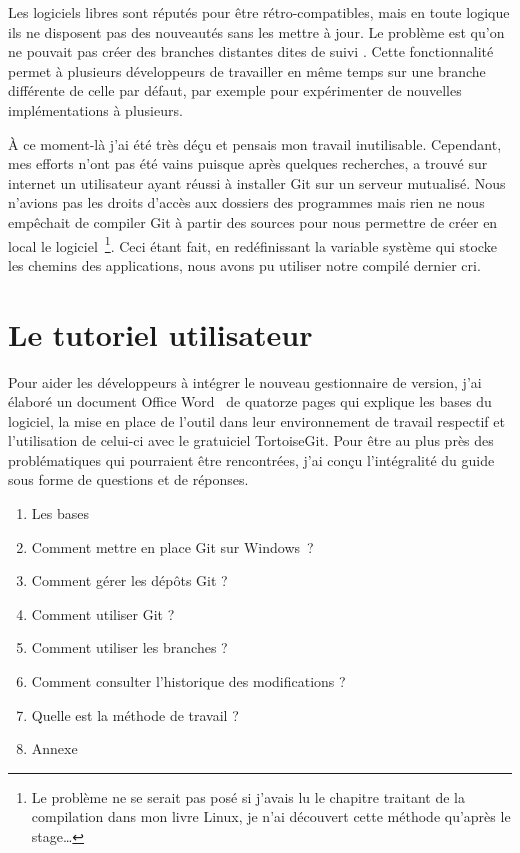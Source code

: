 Les logiciels libres sont réputés pour être rétro-compatibles, mais en
toute logique ils ne disposent pas des nouveautés sans les mettre à jour.
Le problème est qu'on ne pouvait pas créer des branches distantes dites
\og de suivi \fg{}. Cette fonctionnalité permet à plusieurs développeurs
de travailler en même temps sur une branche différente de celle par
défaut, par exemple pour expérimenter de nouvelles implémentations à
plusieurs.

À ce moment-là j'ai été très déçu et pensais mon travail inutilisable.
Cependant, mes efforts n'ont pas été vains puisque  après
quelques recherches, a trouvé sur internet un utilisateur ayant réussi à
installer Git sur un serveur mutualisé.  Nous n'avions pas les droits
d'accès aux dossiers des programmes mais rien ne nous empêchait de
compiler Git à partir des sources pour nous permettre de créer en local
le logiciel\, \footnote{Le problème ne se serait pas posé si j'avais lu
le chapitre traitant de la compilation dans mon livre Linux, je n'ai
découvert cette méthode qu'après le stage\dots}. Ceci étant fait, en
redéfinissant la variable système qui stocke les chemins des
applications, nous avons pu utiliser notre compilé dernier cri.

\section{Le tutoriel utilisateur} %
\label{sec:Le tutoriel utilisateur}

Pour aider les développeurs à intégrer le nouveau gestionnaire de
version, j'ai élaboré un document Office Word~\textregistered{} de
quatorze pages qui explique les bases du logiciel, la mise en place de
l'outil dans leur environnement de travail respectif et l'utilisation de
celui-ci avec le gratuiciel TortoiseGit.  Pour être au plus près des
problématiques qui pourraient être rencontrées, j'ai conçu l'intégralité
du guide sous forme de questions et de réponses.

\begin{enumerate}
  \item Les bases
  \item Comment mettre en place Git sur Windows~\textregistered ?
  \item Comment gérer les dépôts Git ?
  \item Comment utiliser Git ?
  \item Comment utiliser les branches ?
  \item Comment consulter l'historique des modifications ?
  \item Quelle est la méthode de travail ?
  \item Annexe
\end{enumerate}

